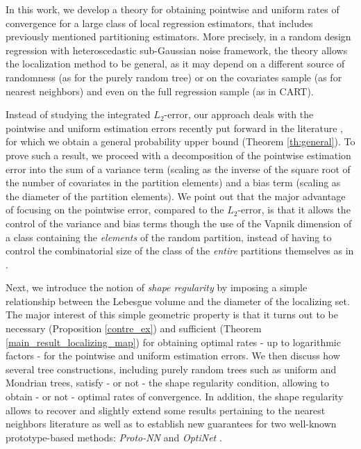 \documentclass[paper=a4, fontsize=11pt]{scrartcl}
\begin{document}
%
%
In this work, we develop a theory for obtaining pointwise and uniform rates of convergence for a large class of local regression estimators, that includes previously mentioned partitioning estimators. More precisely, in a random design regression with heteroscedastic sub-Gaussian noise framework, the theory allows the localization method to be general, as it may depend on a different source of randomness (as for the purely random tree) or on the covariates sample (as for nearest neighbors) and even on the full regression sample (as in CART). 

Instead of studying the integrated $L_2$-error, our approach deals with the pointwise and uniform estimation errors recently put forward in the literature \cite{cattaneo2022pointwise}, for which we obtain a general probability upper bound (Theorem \ref{th:general}). To prove such a result, we proceed with a decomposition of the pointwise estimation error into the sum of a variance term (scaling as the inverse of the square root of the number of covariates in the partition elements) and a bias term (scaling as the diameter of the partition elements). We point out that the major advantage of focusing on the pointwise error, compared to the $L_2$-error, is that it allows the control of the variance and bias terms though the use of the Vapnik dimension of a class containing the \textit{elements} of the random partition, instead of having to control the combinatorial size of the class of the \textit{entire} partitions themselves as in \cite{lugosinobel}.

Next, we introduce the notion of \textit{shape regularity} by imposing a simple relationship between the Lebesgue volume and the diameter of the localizing set. The major interest of this simple geometric property is that it turns out to be necessary (Proposition \ref{contre_ex}) and sufficient (Theorem \ref{main_result_localizing_map}) for obtaining optimal rates - up to logarithmic factors - for the pointwise and uniform estimation errors. We then discuss how several tree constructions, including purely random trees such as uniform and Mondrian trees, satisfy - or not - the shape regularity condition, allowing to obtain  - or not - optimal rates of convergence. In addition,  the shape regularity allows to recover and slightly extend some results pertaining to the nearest neighbors literature \cite{jiang2019non,portier2021nearest} as well as to establish new guarantees for two well-known prototype-based methods: \textit{Proto-NN} \citep{gyorfi2021universal} and \textit{OptiNet} \citep{NIPS2014_8c19f571,NIPS2017_934815ad,hanneke2021universal,kerem2023error}.
\end{document}
